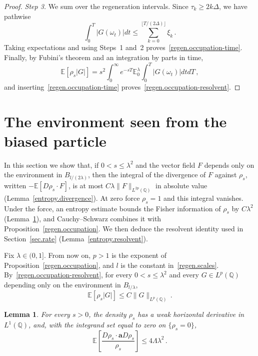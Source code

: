 \documentclass[11pt]{amsart}
\newtheorem{lemma}[proposition]{Lemma}
\theoremstyle{definition}
\theoremstyle{remark}
\numberwithin{equation}{section}
\newcommand{\E}{\mathbb E}
\newcommand{\Q}{\mathbb Q}
\renewcommand{\a}{\mathbf a}
\begin{document}
\begin{proof}
\emph{Step 3.} We sum over the regeneration intervals. Since $\tau_k\geq2k\Delta$, we have pathwise
\begin{equation*}
 \int_0^T|G(\omega_t)|dt
 \leq\sum_{k=0}^{\lfloor T/(2\Delta)\rfloor}\xi_k\, .
\end{equation*}
Taking expectations and using Steps~1 and~2 proves~\eqref{regen.occupation-time}. Finally, by Fubini's theorem and an integration by parts in time,
\begin{equation*}
 \E[\rho_s|G|]
 =s^2\int_0^\infty e^{-sT}
 \mathbb E^\lambda_0\int_0^T|G(\omega_t)|dtdT\, ,
\end{equation*}
and inserting~\eqref{regen.occupation-time} proves~\eqref{regen.occupation-resolvent}.
\end{proof}

\section{The environment seen from the biased particle}\label{sec.entropy}

In this section we show that, if $0<s\leq\lambda^2$ and the vector field $F$ depends only on the environment in $B_{l/(2\lambda)}$, then the integral of the divergence of $F$ against $\rho_s$, written $-\E[D\rho_s\cdot F]$, is at most $C\lambda\|F\|_{L^{2p}(\Q)}$ in absolute value (Lemma~\ref{entropy.divergence}). At zero force $\rho_s=1$ and this integral vanishes. Under the force, an entropy estimate bounds the Fisher information of $\rho_s$ by $C\lambda^2$ (Lemma~\ref{entropy.fisher}), and Cauchy--Schwarz combines it with Proposition~\ref{regen.occupation}. We then deduce the resolvent identity used in Section~\ref{sec.rate} (Lemma~\ref{entropy.resolvent}).

Fix $\lambda\in(0,1]$. From now on, $p>1$ is the exponent of Proposition~\ref{regen.occupation}, and $l$ is the constant in~\eqref{regen.scales}. By~\eqref{regen.occupation-resolvent}, for every $0<s\leq\lambda^2$ and every $G\in L^p(\Q)$ depending only on the environment in $B_{l/\lambda}$,
\begin{equation}\label{entropy.occupation}
 \E[\rho_s|G|]\leq C\|G\|_{L^p(\Q)}\, .
\end{equation}

\begin{lemma}\label{entropy.fisher}
For every $s>0$, the density $\rho_s$ has a weak horizontal derivative in $L^1(\Q)$, and, with the integrand set equal to zero on $\{\rho_s=0\}$,
\begin{equation}\label{entropy.fisher.bound}
 \E\left[\frac{D\rho_s\cdot\a D\rho_s}{\rho_s}\right]
 \leq 4\Lambda\lambda^2\, .
\end{equation}
\end{lemma}
\end{document}
